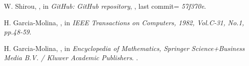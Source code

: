 \documentclass[USenglish]{uit-thesis}
\begin{document}
\begin{thebibliography}{9}
W. Shirou,
,
\newblock in {\em GitHub: GitHub repository},
, last commit={ \textit{57f370e}}.

H. Garcia-Molina,
,
\newblock in {\em IEEE Transactions on Computers, 1982, Vol.C-31, No.1, pp.48-59}.



H. Garcia-Molina,
,
\newblock in {\em  Encyclopedia of Mathematics, Springer Science+Business Media B.V. / Kluwer Academic Publishers}.
.

\end{thebibliography}
\end{document}
